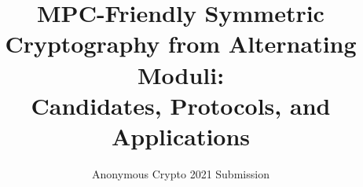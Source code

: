 \documentclass[11pt]{article}
\begin{document}
\title{MPC-Friendly Symmetric Cryptography from Alternating Moduli: \\Candidates, Protocols, and Applications}
\author{Anonymous Crypto 2021 Submission}
\institute{}
\date{}

\maketitle


\end{document}
